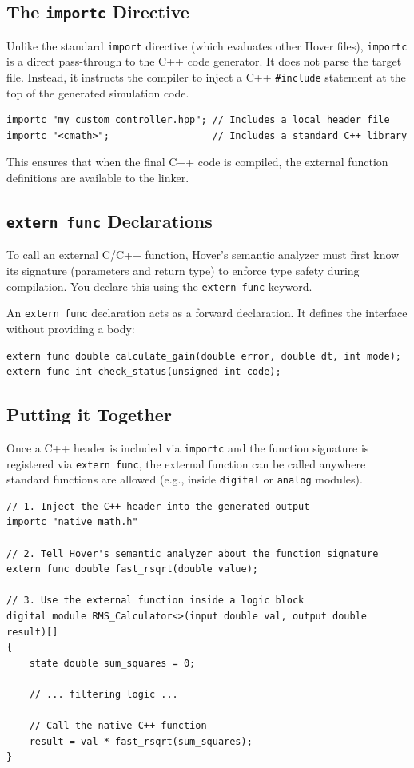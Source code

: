 \documentclass[11pt, a4paper]{article}
\newcommand{\code}[1]{\texttt{\small #1}}
\begin{document}
\subsection{The \code{importc} Directive}

Unlike the standard \code{import} directive (which evaluates other Hover files), \code{importc} is a direct pass-through to the C++ code generator. It does not parse the target file. Instead, it instructs the compiler to inject a C++ \code{\#include} statement at the top of the generated simulation code.

\begin{lstlisting}
importc "my_custom_controller.hpp"; // Includes a local header file
importc "<cmath>";                  // Includes a standard C++ library
\end{lstlisting}

This ensures that when the final C++ code is compiled, the external function definitions are available to the linker.

\subsection{\code{extern func} Declarations}

To call an external C/C++ function, Hover's semantic analyzer must first know its signature (parameters and return type) to enforce type safety during compilation. You declare this using the \code{extern func} keyword. 

An \code{extern func} declaration acts as a forward declaration. It defines the interface without providing a body:

\begin{lstlisting}
extern func double calculate_gain(double error, double dt, int mode);
extern func int check_status(unsigned int code);
\end{lstlisting}

\subsection{Putting it Together}

Once a C++ header is included via \code{importc} and the function signature is registered via \code{extern func}, the external function can be called anywhere standard functions are allowed (e.g., inside \code{digital} or \code{analog} modules).

\begin{lstlisting}
// 1. Inject the C++ header into the generated output
importc "native_math.h"

// 2. Tell Hover's semantic analyzer about the function signature
extern func double fast_rsqrt(double value);

// 3. Use the external function inside a logic block
digital module RMS_Calculator<>(input double val, output double result)[] 
{
    state double sum_squares = 0;
    
    // ... filtering logic ...

    // Call the native C++ function
    result = val * fast_rsqrt(sum_squares); 
}
\end{lstlisting}
\end{document}
